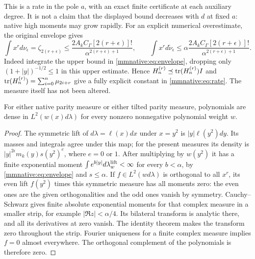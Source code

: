 This is a rate in the pole $a$, with an exact finite certificate at
each auxiliary degree.  It is not a claim that the displayed bound
decreases with $d$ at fixed $a$: native high moments may grow rapidly.
For an explicit numerical overestimate, the original envelope gives
\begin{equation}\label{mmnative:eq:momentcap}
 \int x^r d\nu_\epsilon
 =\zeta_{2(r+\epsilon)}
 \le\frac{2A_kC_\Gamma[2(r+\epsilon)]!}
 {\alpha^{2(r+\epsilon)+1}},\qquad
 \int x^r d\widetilde\nu_\epsilon
 \le\alpha\frac{2A_kC_\Gamma[2(r+\epsilon)]!}
 {\alpha^{2(r+\epsilon)+1}}.
\end{equation}
Indeed integrate the upper bound in \eqref{mmnative:eq:envelope}, dropping
only $(1+|y|)^{-1/2}\le1$ in this upper estimate.  Hence
$H_n^{(r)}\preceq\operatorname{tr}(H_n^{(r)})I$ and
$\operatorname{tr}(H_n^{(r)})=\sum_{i=0}^n\mu_{2i+r}$ give a fully explicit
constant in \eqref{mmnative:eq:rate}.  The measure itself has not been altered.

\begin{mmnativelemma}\label{mmnative:lem:density}
For either native parity measure or either tilted parity measure,
polynomials are dense in $L^2(w(x)d\lambda)$ for every nonzero
nonnegative polynomial weight $w$.
\end{mmnativelemma}
\begin{proof}
The symmetric lift of $d\lambda=\ell(x)dx$ under $x=y^2$ is
$|y|\ell(y^2)dy$.  Its masses and integrals agree under this map;
for the present measures its density is
$|y|^{2\epsilon}m_k(y)s(y^2)^e$, where $e=0$ or $1$.
After multiplying by $w(y^2)$ it has a finite exponential moment
$\int e^{b|y|}d\lambda_w^{\rm lift}<\infty$ for every $b<\alpha$,
by \eqref{mmnative:eq:envelope} and $s\le\alpha$.
If $f\in L^2(wd\lambda)$ is orthogonal to all $x^r$, its even
lift $f(y^2)$ times this symmetric measure has all moments zero:
the even ones are the given orthogonalities and the odd ones vanish
by symmetry.  Cauchy--Schwarz gives finite absolute exponential
moments for that complex measure in a smaller strip, for example
$|\Re z|<\alpha/4$.  Its bilateral transform is analytic there,
and all its derivatives at zero vanish.  The identity theorem makes
the transform zero throughout the strip.  Fourier uniqueness for a
finite complex measure implies $f=0$ almost everywhere.  The
orthogonal complement of the polynomials is therefore zero.
\end{proof}

